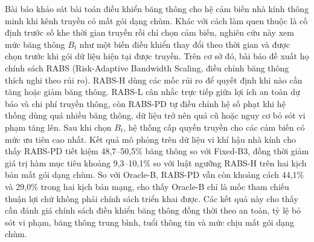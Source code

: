\documentclass[10pt]{article}
\begin{document}


\begin{vnabstract}
Bài báo khảo sát bài toán điều khiển băng thông cho hệ cảm biến nhà kính thông minh khi kênh truyền có mất gói dạng chùm. Khác với cách làm quen thuộc là cố định trước số khe thời gian truyền rồi chỉ chọn cảm biến, nghiên cứu này xem mức băng thông $B_t$ như một biến điều khiển thay đổi theo thời gian và được chọn trước khi gói dữ liệu hiện tại được truyền. Trên cơ sở đó, bài báo đề xuất họ chính sách RABS (Risk-Adaptive Bandwidth Scaling, điều chỉnh băng thông thích nghi theo rủi ro). RABS-H dùng các mốc rủi ro để quyết định khi nào cần tăng hoặc giảm băng thông. RABS-L cân nhắc trực tiếp giữa lợi ích an toàn dự báo và chi phí truyền thông, còn RABS-PD tự điều chỉnh hệ số phạt khi hệ thống dùng quá nhiều băng thông, dữ liệu trở nên quá cũ hoặc nguy cơ bỏ sót vi phạm tăng lên. Sau khi chọn $B_t$, hệ thống cấp quyền truyền cho các cảm biến có mức ưu tiên cao nhất. Kết quả mô phỏng trên dữ liệu vi khí hậu nhà kính cho thấy RABS-PD tiết kiệm 48,7--50,5\% băng thông so với Fixed-B3, đồng thời giảm giá trị hàm mục tiêu khoảng 9,3--10,1\% so với luật ngưỡng RABS-H trên hai kịch bản mất gói dạng chùm. So với Oracle-B, RABS-PD vẫn còn khoảng cách 44,1\% và 29,0\% trong hai kịch bản mạng, cho thấy Oracle-B chỉ là mốc tham chiếu thuận lợi chứ không phải chính sách triển khai được. Các kết quả này cho thấy cần đánh giá chính sách điều khiển băng thông đồng thời theo an toàn, tỷ lệ bỏ sót vi phạm, băng thông trung bình, tuổi thông tin và mức chịu mất gói dạng chùm.
\end{vnabstract}

\newpage

\end{document}
